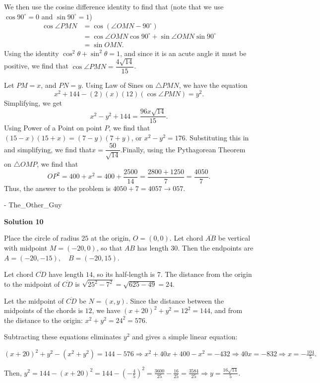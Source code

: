 \begin{enumerate}
 We then use the cosine difference identity to find that (note that we use $\cos 90^\circ =0$ and $\sin 90^\circ = 1$)\begin{align*}\cos\angle{PMN}&=\cos(\angle{OMN}-90^\circ)\\&=\cos\angle{OMN}\cos 90^\circ + \sin\angle{OMN}\sin 90^\circ\\&=\sin{OMN}.\end{align*}
Using the identity $\cos^2 \theta+\sin^2 \theta=1$, and since it is an acute angle it must be positive, we find that $\cos\angle{PMN}=\dfrac{4\sqrt{14}}{15}$.

 Let $PM=x$, and $PN=y$. Using Law of Sines on $\triangle{PMN}$, we have the equation
 \[x^2+144-(2)(x)(12)(\cos\angle{PMN})=y^2.\]Simplifying, we get
 \[x^2-y^2+144=\dfrac{96x\sqrt{14}}{15}.\]Using Power of a Point on point $P$, we find that $(15-x)(15+x)=(7-y)(7+y)$, or $x^2-y^2=176$. Substituting this in and simplifying, we find that$x=\dfrac{50}{\sqrt{14}}$.Finally, using the Pythagorean Theorem on $\triangle{OMP}$, we find that
 \[OP^2=400+x^2=400+\dfrac{2500}{14}=\dfrac{2800+1250}{7}=\dfrac{4050}{7}.\]Thus, the answer to the problem is $4050+7=4057\rightarrow \boxed{057}.$

 - The\_Other\_Guy

 



\textbf{Solution 10}

Place the circle of radius $25$ at the origin, $O=(0,0)$. Let chord $\overline{AB}$ be vertical with midpoint $M=(-20,0)$, so that $AB$ has length $30$. Then the endpoints are $A=(-20,-15), \quad B=(-20,15)$.

 Let chord $\overline{CD}$ have length $14$, so its half-length is $7$. The distance from the origin to the midpoint of $\overline{CD}$ is $\sqrt{25^2 - 7^2} = \sqrt{625 - 49} = 24.$

 Let the midpoint of $\overline{CD}$ be $N=(x,y)$. Since the distance between the midpoints of the chords is $12$, we have $(x+20)^2 + y^2 = 12^2 = 144$, and from the distance to the origin: $x^2 + y^2 = 24^2 = 576$.

 Subtracting these equations eliminates $y^2$ and gives a simple linear equation:

 $(x+20)^2 + y^2 - (x^2 + y^2) = 144 - 576 \Rightarrow x^2 + 40x + 400 - x^2 = -432 \Rightarrow 40x = -832 \Rightarrow x = -\frac{104}{5}.$

 Then, $y^2 = 144 - (x+20)^2 = 144 - \left(-\frac{4}{5}\right)^2 = \frac{3600}{25} - \frac{16}{25} = \frac{3584}{25} \Rightarrow y = \frac{16\sqrt{14}}{5}.$


\end{enumerate}
